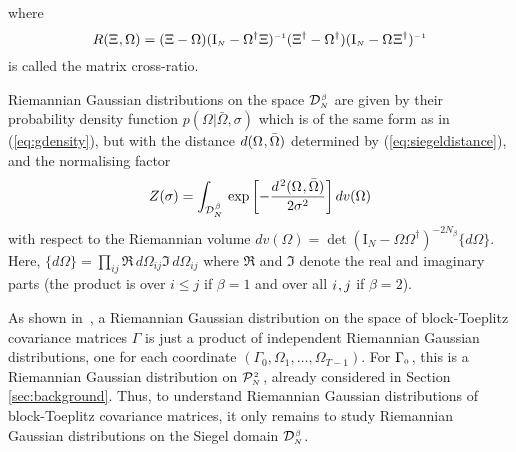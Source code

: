 \documentclass[draftclsnofoot]{IEEEtran}
\begin{document}
where 
\begin{equation*}
R(\Xi\hspace{0.02cm},\Omega) = (\Xi - \Omega)(\mathrm{I}_{\scriptscriptstyle N} - \Omega^\dagger\Xi)^{\scriptscriptstyle -1}(\Xi^\dagger - \Omega^\dagger)(\mathrm{I}_{\scriptscriptstyle N} - \Omega\hspace{0.02cm}\Xi^\dagger)^{\scriptscriptstyle -1}
\end{equation*}
is called the matrix cross-ratio.

Riemannian Gaussian distributions on the space $\mathcal{D}^{\hspace{0.02cm}\scriptscriptstyle \beta}_{\scriptscriptstyle N}$ are given by their probability density function $p(\Omega|\bar{\Omega},\sigma)$ which is of the same form as in (\ref{eq:gdensity}), but with the distance $d(\Omega\hspace{0.02cm},\bar{\Omega})$ determined by (\ref{eq:siegeldistance}), and the normalising factor
\begin{equation} \label{eq:Zsiegel}
Z(\sigma) = \int_{\mathcal{D}^{\hspace{0.02cm}\scriptscriptstyle \beta}_{\scriptscriptstyle N}}\,\exp\left[-\frac{d^{\hspace{0.03cm} 2}(\Omega\hspace{0.02cm},\bar{\Omega})}{2\sigma^2}\right]dv(\Omega)
\end{equation}
with respect to the Riemannian volume $dv(\Omega) = \det(\mathrm{I}_{\scriptscriptstyle N} - \Omega\Omega^\dagger)^{-2N_\beta}\lbrace d\Omega\rbrace$. Here, $\lbrace d\Omega \rbrace =\prod_{ij} \Re\,d\Omega_{ij}\Im\,d\Omega_{ij}$ where $\Re$ and $\Im$ denote the real and imaginary parts (the product is over $i \leq j$ if $\beta = 1$ and over all $i\hspace{0.02cm},j$ if $\beta = 2$).

As shown in~\cite{Sa17}, a Riemannian Gaussian distribution on the space of block-Toeplitz covariance matrices $\Gamma$ is just a product of independent Riemannian Gaussian distributions, one for each coordinate $(\Gamma_{\scriptscriptstyle 0},\Omega_{\scriptscriptstyle 1},\ldots, \Omega_{\scriptscriptstyle T-1})$. For $\Gamma_{\scriptscriptstyle 0}\hspace{0.03cm}$, this is a Riemannian Gaussian distribution on $\mathcal{P}^{\hspace{0.02cm}\scriptscriptstyle 2}_{\scriptscriptstyle N\hspace{0.03cm}}$, already considered in Section \ref{sec:background}. Thus, to understand Riemannian Gaussian distributions of block-Toeplitz covariance matrices, it only remains to study Riemannian Gaussian distributions on the Siegel domain $\mathcal{D}^{\hspace{0.02cm}\scriptscriptstyle \beta}_{\scriptscriptstyle N}$. 
\end{document}
